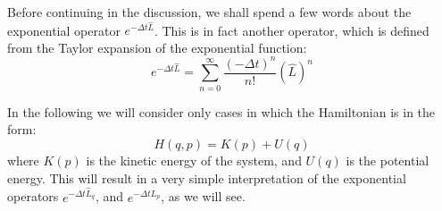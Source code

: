             Before continuing in the discussion, we shall spend a few words about the exponential operator $e^{-\Delta t \hat{L}}$. This is in fact another operator, which is defined from the Taylor expansion of the exponential function:
            \begin{equation}
                e^{-\Delta t \hat{L}}=\sum_{n=0}^\infty\frac{(-\Delta t)^n}{n!}(\hat{L})^n
            \end{equation}
            
            In the following we will consider only cases in which the Hamiltonian is in the form:
            \begin{equation}\label{eq:sepHam}
                H(q,p)=K(p)+U(q)
            \end{equation}
            where $K(p)$ is the kinetic energy of the system, and $U(q)$ is the potential energy. This will result in a very simple interpretation of the exponential operators $e^{-\Delta t \hat{L}_q}$, and $e^{-\Delta t \hat{L}_p}$, as we will see.
            
